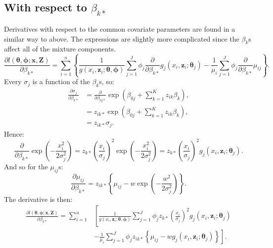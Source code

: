 \subsection{With respect to $\beta_{k*}$}

Derivatives with respect to the common covariate parameters are found in a similar way to above. The expressions are slightly more complicated since the $\beta_k$s \label{cor-r4-2}affect all of the mixture components.
\begin{equation*}
\frac{\partial l(\bm{\theta},\bm{\phi}; \mathbf{x},\mathbf{Z})}{\partial \beta_{k*}} = \sum_{i=1}^n \left \{ \frac{1}{g(x_i,\mathbf{z}_i; \bm{\theta},\bm{\phi})} \sum_{j=1}^J \phi_j \frac{\partial}{\partial \beta_{k*}} g_j(x_i,\mathbf{z}_i; \bm{\theta}_j) - \frac{1}{\mu_i} \sum_{j=1}^J \phi_j \frac{\partial}{\partial \beta_{k*}}\mu_{ij}\right \}.
\end{equation*}
Every $\sigma_{j}$ is a function of the $\beta_{k}$s, so:
\begin{align*}
\frac{\partial \sigma_{j}}{\partial \beta_{k*}} &= \frac{\partial}{\partial \beta_{0j*}} \exp \left ( \beta_{0j} + \sum_{k=1}^K z_{ik} \beta_{k}\right ),\\
&= z_{ik*} \exp \left ( \beta_{0j} + \sum_{k=1}^K z_{ik} \beta_{k}\right ),\\
&= z_{ik*}\sigma_{j}.
\end{align*}
Hence:
\begin{equation*}
 \frac{\partial}{\partial \beta_{k*}} \exp\left ( -\frac{x_i^2}{2\sigma_{j}^2} \right ) = z_{k*} \left ( \frac{x_i}{\sigma_{j}}\right )^2 \exp \left (-\frac{x_i^2}{2 \sigma_{j}^2}\right ) = z_{k*} \left ( \frac{x_i}{\sigma_{j}}\right )^2 g_j(x_i,\mathbf{z}_i; \bm{\theta}_j).
 \label{detfct-deriv-k}
\end{equation*}
And so for the $\mu_{ij}$s:
\begin{equation*}
\frac{\partial \mu_{ij}}{\partial \beta_{k*}} = z_{ik*} \left \{ \mu_{ij} - w \exp\left ( -\frac{w^2}{2\sigma_{j}^2} \right ) \right \}.
\end{equation*}
The derivative is then:
\begin{align*}
\frac{\partial l(\bm{\theta},\bm{\phi}; \mathbf{x},\mathbf{Z})}{\partial \beta_{k*}} = \sum_{i=1}^n & \left [ \frac{1}{g(x_i,\mathbf{z}_i; \bm{\theta},\bm{\phi})} \sum_{j=1}^J \phi_j  z_{k*} \left ( \frac{x_i}{\sigma_{j}}\right )^2 g_j(x_i,\mathbf{z}_i; \bm{\theta}_j) \right. \\
& - \left. \frac{1}{\mu_i} \sum_{j=1}^J \phi_j z_{ik*} \left \{ \mu_{ij} - w g_j(x_i,\mathbf{z}_i; \bm{\theta}_j) \right \} \right ].
\end{align*}

